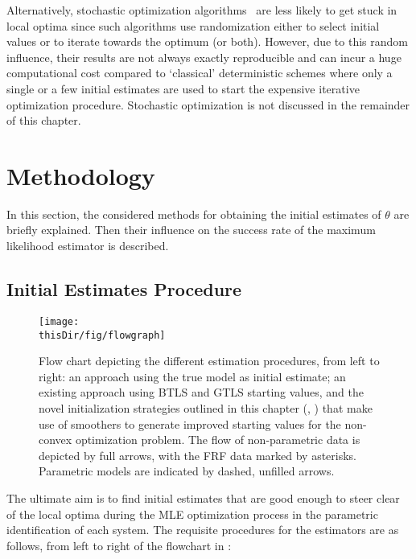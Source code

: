 \begin{remark}
Alternatively, stochastic optimization algorithms~\citep{Spall2012,Press2007} are less likely to get stuck in local optima since such algorithms use randomization either to select initial values or to iterate towards the optimum (or both).
However, due to this random influence, their results are not always exactly reproducible and can incur a huge computational cost compared to `classical' deterministic schemes where only a single or a few initial estimates are used to start the expensive iterative optimization procedure.
Stochastic optimization is not discussed in the remainder of this chapter.
\end{remark}

\section{Methodology}\label{sec:initial-values:MethodEg}
In this section, the considered methods for obtaining the initial estimates of $\theta$ are briefly explained. Then their influence on the success rate of the maximum likelihood estimator is described.

\subsection{Initial Estimates Procedure}\label{sec:init:procedures}
\begin{figure}[p]
  \centering
  \texttt{[image: \\thisDir/fig/flowgraph]}
  \caption[Flow chart of different initialization procedures.]{Flow chart depicting the different estimation procedures, from left to right:  an approach using the true model as initial estimate;  an existing approach using \gls{BTLS} and \gls{GTLS} starting values, and the novel initialization strategies outlined in this chapter (, ) that make use of smoothers to generate improved starting values for the non-convex optimization problem.
  The flow of non-parametric data is depicted by full arrows, with the \gls{FRF} data marked by asterisks. Parametric models are indicated by dashed, unfilled arrows.} 
  \label{fig:flowgraph}
\end{figure}

The ultimate aim is to find initial estimates that are good enough to steer clear of the local optima during the \gls{MLE} optimization process in the parametric identification of each system. 
The requisite procedures for the estimators are as follows, from left to right of the flowchart in :

